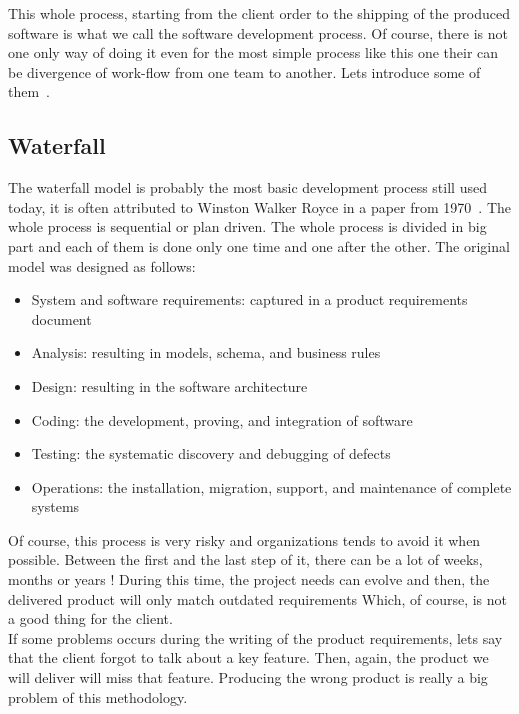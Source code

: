 \documentclass[12pt]{article}
\begin{document}
This whole process, starting from the client order to the shipping of the produced software is what we call the software development process. Of course, there is not one only way of doing it even for the most simple process like this one their can be divergence of work-flow from one team to another. Lets introduce some of them~\cite{IIS2:IIS202348}.

\subsection{Waterfall}

The waterfall model is probably the most basic development process still used today, it is often attributed to Winston Walker Royce in a paper from 1970~\cite{BARYWBoehm:1987}. The whole process is sequential or plan driven. The whole process is divided in big part and each of them is done only one time and one after the other. The original model was designed as follows:\\

\begin{itemize}

\item System and software requirements: captured in a product requirements document
\item Analysis: resulting in models, schema, and business rules
\item Design: resulting in the software architecture
\item Coding: the development, proving, and integration of software
\item Testing: the systematic discovery and debugging of defects
\item Operations: the installation, migration, support, and maintenance of complete systems

\end{itemize}

Of course, this process is very risky and organizations tends to avoid it when possible. Between the first and the last step of it, there can be a lot of weeks, months or years ! During this time, the project needs can evolve and then, the delivered product will only match outdated requirements Which, of course, is not a good thing for the client.\\

If some problems occurs during the writing of the product requirements, lets say that the client forgot to talk about a key feature. Then, again, the product we will deliver will miss that feature. Producing the wrong product is really a big problem of this methodology.\\
\end{document}
